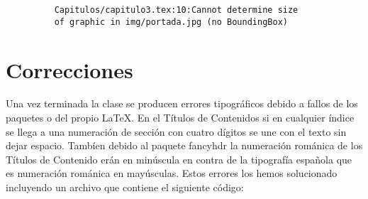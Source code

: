 \begin{itemize}
\begin{itemize}
\begin{figure}[h]
\begin{fblock}
{\begin{verbatim}
	Capitulos/capitulo3.tex:10:Cannot determine size 
	of graphic in img/portada.jpg (no BoundingBox)
  	\end{verbatim}
	}
 	\end{fblock}
	
	\end{figure}
	\end{itemize}

\section{Correcciones}
	Una vez terminada la clase se producen errores tipográficos debido a fallos de los paquetes o del propio \LaTeX{}.
	En el Títulos de Contenidos si en cualquier índice se llega a una numeración de sección con cuatro dígitos se une con el texto sin dejar espacio.
	Tambíen debido al paquete fancyhdr la numeración románica de los Títulos de Contenido erán en minúscula en contra de la tipografía española que es numeración románica en mayúsculas.
	Estos errores los hemos solucionado incluyendo un archivo \verb|| que contiene el siguiente código:



\end{itemize}


